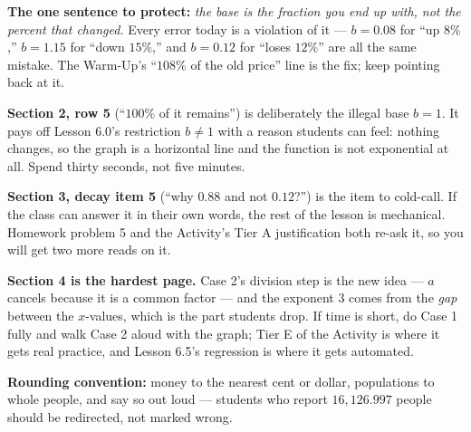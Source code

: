 \documentclass[10pt]{article}
\begin{document}
\begin{teachernote}
\textbf{The one sentence to protect:} \emph{the base is the fraction you end up with, not the
percent that changed.} Every error today is a violation of it --- $b=0.08$ for ``up $8\%$,''
$b=1.15$ for ``down $15\%$,'' and $b=0.12$ for ``loses $12\%$'' are all the same mistake. The
Warm-Up's ``$108\%$ of the old price'' line is the fix; keep pointing back at it.

\textbf{Section 2, row 5} (``$100\%$ of it remains'') is deliberately the illegal base $b=1$. It pays
off Lesson 6.0's restriction $b\ne1$ with a reason students can feel: nothing changes, so the graph
is a horizontal line and the function is not exponential at all. Spend thirty seconds, not five
minutes.

\textbf{Section 3, decay item 5} (``why $0.88$ and not $0.12$?'') is the item to cold-call. If the
class can answer it in their own words, the rest of the lesson is mechanical. Homework problem 5 and
the Activity's Tier A justification both re-ask it, so you will get two more reads on it.

\textbf{Section 4 is the hardest page.} Case 2's division step is the new idea --- $a$ cancels
because it is a common factor --- and the exponent $3$ comes from the \emph{gap} between the
$x$-values, which is the part students drop. If time is short, do Case 1 fully and walk Case 2
aloud with the graph; Tier E of the Activity is where it gets real practice, and Lesson 6.5's
regression is where it gets automated.

\textbf{Rounding convention:} money to the nearest cent or dollar, populations to whole people, and
say so out loud --- students who report $16{,}126.997$ people should be redirected, not marked wrong.
\end{teachernote}
\end{document}
